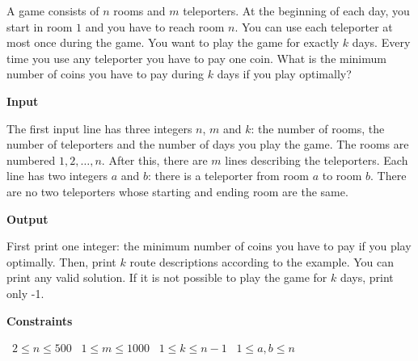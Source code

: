 A game consists of $n$ rooms and $m$ teleporters. At the beginning of each day, you start in room $1$ and you have to reach room $n$.
You can use each teleporter at most once during the game. You want to play the game for exactly $k$ days. Every time you use any teleporter you have to pay one coin. What is the minimum number of coins you have to pay during $k$ days if you play optimally?

\vspace{0.3cm}\noindent\textbf{Input}

The first input line has three integers $n$, $m$ and $k$: the number of rooms, the number of teleporters and the number of days you play the game. The rooms are numbered $1,2,\dots,n$.
After this, there are $m$ lines describing the teleporters. Each line has two integers $a$ and $b$: there is a teleporter from room $a$ to room $b$.
There are no two teleporters whose starting and ending room are the same.

\vspace{0.3cm}\noindent\textbf{Output}

First print one integer: the minimum number of coins you have to pay if you play optimally. Then, print $k$ route descriptions according to the example. You can print any valid solution.
If it is not possible to play the game for $k$ days, print only -1.

\vspace{0.3cm}\noindent\textbf{Constraints}

\textbullet\ $2 \le n \le 500$
\textbullet\ $1 \le m \le 1000$
\textbullet\ $1 \le k \le n-1$
\textbullet\ $1 \le a,b \le n$